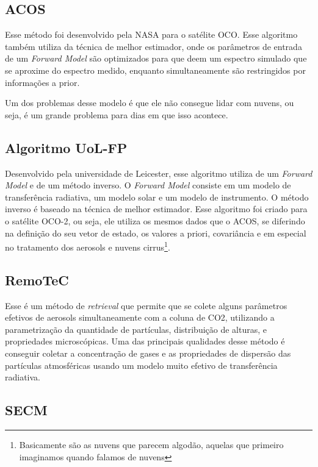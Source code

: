 \documentclass{article}[12pt]
\begin{document}
\subsection{ACOS}

Esse método foi desenvolvido pela NASA para o satélite OCO. Esse algoritmo também utiliza da técnica
de melhor estimador, onde os parâmetros de entrada de um \textit{Forward Model}
são optimizados para que deem um espectro simulado que se aproxime do espectro medido, enquanto
simultaneamente são restringidos por informações a prior. \par 

Um dos problemas desse modelo é que ele não consegue lidar com nuvens, ou seja, é um grande problema
para dias em que isso acontece. \par

\subsection{Algoritmo UoL-FP}
Desenvolvido pela universidade de Leicester, esse algoritmo utiliza de um \textit{Forward Model} e
de um método inverso. O \textit{Forward Model} consiste em um modelo de transferência radiativa, um
modelo solar e um modelo de instrumento. O método inverso é baseado na técnica de melhor estimador.
Esse algoritmo foi criado para o satélite OCO-2, ou seja, ele utiliza os mesmos dados que o ACOS, se
diferindo na definição do seu vetor de estado, os valores a priori, covariância e em especial no
tratamento dos aerosols e nuvens cirrus\footnote{Basicamente são as nuvens que parecem algodão,
aquelas que primeiro imaginamos quando falamos de nuvens}. \par

\subsection{RemoTeC}

Esse é um método de \textit{retrieval} que permite que se colete alguns parâmetros efetivos de
aerosols simultaneamente com a coluna de CO2, utilizando a parametrização da quantidade de
partículas, distribuição de alturas, e propriedades microscópicas. Uma das principais qualidades
desse método é conseguir coletar a concentração de gases e as propriedades de dispersão das
partículas atmosféricas usando um modelo muito efetivo de transferência radiativa. \par

\subsection{SECM}
\end{document}
